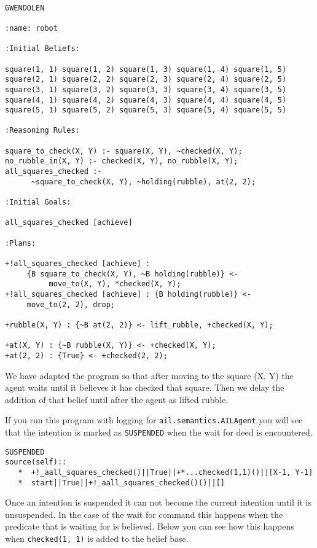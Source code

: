 \begin{ourexample}
\label{code:pickuprubble_waitfor} \quad \\
\begin{lstlisting}[basicstyle=\sffamily,style=easslisting,language=Gwendolen]
GWENDOLEN

:name: robot

:Initial Beliefs:

square(1, 1) square(1, 2) square(1, 3) square(1, 4) square(1, 5)
square(2, 1) square(2, 2) square(2, 3) square(2, 4) square(2, 5)
square(3, 1) square(3, 2) square(3, 3) square(3, 4) square(3, 5)
square(4, 1) square(4, 2) square(4, 3) square(4, 4) square(4, 5)
square(5, 1) square(5, 2) square(5, 3) square(5, 4) square(5, 5)

:Reasoning Rules:

square_to_check(X, Y) :- square(X, Y), ~checked(X, Y);
no_rubble_in(X, Y) :- checked(X, Y), no_rubble(X, Y);
all_squares_checked :-
      ~square_to_check(X, Y), ~holding(rubble), at(2, 2);

:Initial Goals:

all_squares_checked [achieve]

:Plans:

+!all_squares_checked [achieve] : 
     {B square_to_check(X, Y), ~B holding(rubble)} <- 
          move_to(X, Y), *checked(X, Y);
+!all_squares_checked [achieve] : {B holding(rubble)} <- 
     move_to(2, 2), drop;

+rubble(X, Y) : {~B at(2, 2)} <- lift_rubble, +checked(X, Y);

+at(X, Y) : {~B rubble(X, Y)} <- +checked(X, Y);
+at(2, 2) : {True} <- +checked(2, 2);
\end{lstlisting}
\end{ourexample}
We have adapted the program so that after moving to the square (X, Y) the agent waits until it believes it has checked that square.  Then we delay the addition of that belief until after the agent as lifted rubble.

If you run this program with logging for \texttt{ail.semantics.AILAgent} you will see that the intention is marked as \texttt{SUSPENDED} when the wait for deed is encountered.
\begin{verbatim}
SUSPENDED
source(self):: 
   *  +!_aall_squares_checked()||True||+*...checked(1,1)()||[X-1, Y-1]
   *  start||True||+!_aall_squares_checked()()||[]
\end{verbatim}
Once an intention is suspended it can not become the current intention until it is unsuspended.  In the case of the wait for command this happens when the predicate that is waiting for is believed.  Below you can see how this happens when \texttt{checked(1, 1)} is added to the belief base.

